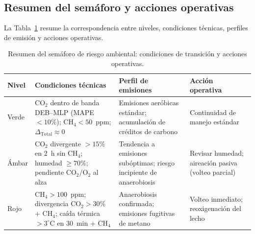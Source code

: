 \subsection{Resumen del semáforo y acciones operativas}
\label{subsec:cap5_resumen_semaforo}

La Tabla~\ref{tab:semaforo_resumen} resume la correspondencia entre niveles, condiciones técnicas, perfiles de emisión y acciones operativas.

\begin{table}[htbp]
\centering
\caption{Resumen del semáforo de riesgo ambiental: condiciones de transición y acciones operativas.}
\label{tab:semaforo_resumen}
\begin{tabular}{p{1.8cm}p{4.5cm}p{3.8cm}p{3.5cm}}
\toprule
\textbf{Nivel} & \textbf{Condiciones técnicas} & \textbf{Perfil de emisiones} & \textbf{Acción operativa} \\
\midrule
Verde & CO$_2$ dentro de banda DEB--MLP (MAPE $< 10$\%); CH$_4 < 50$~ppm; $\Delta_{\mathrm{Total}} \approx 0$ & Emisiones aeróbicas estándar; acumulación de créditos de carbono & Continuidad de manejo estándar \\
Ámbar & CO$_2$ divergente $> 15$\% en 2~h sin CH$_4$; humedad $\geq 70$\%; pendiente CO$_2$/O$_2$ al alza & Tendencia a emisiones subóptimas; riesgo incipiente de anaerobiosis & Revisar humedad; aireación pasiva (volteo parcial) \\
Rojo & CH$_4 > 100$~ppm; divergencia CO$_2 > 30$\% + CH$_4$; caída térmica $> 3^\circ$C en 30~min + CH$_4$ & Anaerobiosis confirmada; emisiones fugitivas de metano & Volteo inmediato; reoxigenación del lecho \\
\bottomrule
\end{tabular}
\end{table}
